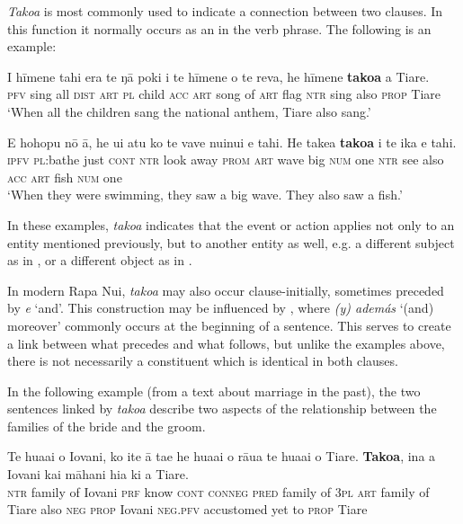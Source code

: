 \textit{Tako{\ꞌ}a} is most commonly used to indicate a connection between two clauses. In this function it normally occurs as an  in the verb phrase. The following is an example:

\ea\label{ex:4.132}
\gll I hīmene tahi era te ŋā poki i te hīmene o te reva,  he hīmene \textbf{tako{\ꞌ}a} a Tiare.\\
\textsc{pfv} sing all \textsc{dist} \textsc{art} \textsc{pl} child \textsc{acc} \textsc{art} song of \textsc{art} flag  \textsc{ntr} sing also \textsc{prop} Tiare\\

\glt 
‘When all the children sang the national anthem, Tiare also sang.’ \textstyleExampleref{[R334.340]} 
\z

\ea\label{ex:4.133}
\gll E hohopu nō {\ꞌ}ā, he u{\ꞌ}i atu ko te vave nuinui e tahi.  He take{\ꞌ}a \textbf{tako{\ꞌ}a} i te ika e tahi.\\
\textsc{ipfv} \textsc{pl}:bathe just \textsc{cont} \textsc{ntr} look away \textsc{prom} \textsc{art} wave big \textsc{num} one  \textsc{ntr} see also \textsc{acc} \textsc{art} fish \textsc{num} one\\

\glt
‘When they were swimming, they saw a big wave. They also saw a fish.’ \textstyleExampleref{[R338.003–004]}
\z

In these examples, \textit{tako{\ꞌ}a} indicates that the event or action applies not only to an entity mentioned previously, but to another entity as well, e.g. a different subject as in , or a different object as in .

In modern Rapa Nui, \textit{tako{\ꞌ}a} may also occur clause-initially, sometimes preceded by \textit{{\ꞌ}e} ‘and’. This construction may be influenced by , where \textit{(y) además} ‘(and) moreover’ commonly occurs at the beginning of a sentence. This serves to create a link between what precedes and what follows, but unlike the examples above, there is not necessarily a constituent which is identical in both clauses. 

In the following example (from a text about marriage in the past), the two sentences linked by \textit{tako}\textit{{\ꞌ}}\textit{a} describe two aspects of the relationship between the families of the bride and the groom.

\ea\label{ex:4.134}
\gll Te hua{\ꞌ}ai o Iovani, ko {\ꞌ}ite {\ꞌ}ā ta{\ꞌ}e he hua{\ꞌ}ai o rāua te hua{\ꞌ}ai o Tiare. \textbf{Tako{\ꞌ}a}, {\ꞌ}ina a Iovani kai māhani hia ki a Tiare. \\
\textsc{ntr} family of Iovani \textsc{prf} know \textsc{cont} \textsc{conneg} \textsc{pred} family of \textsc{3pl} \textsc{art} family of Tiare also \textsc{neg} \textsc{prop} Iovani \textsc{neg.pfv} accustomed yet to \textsc{prop} Tiare \\

